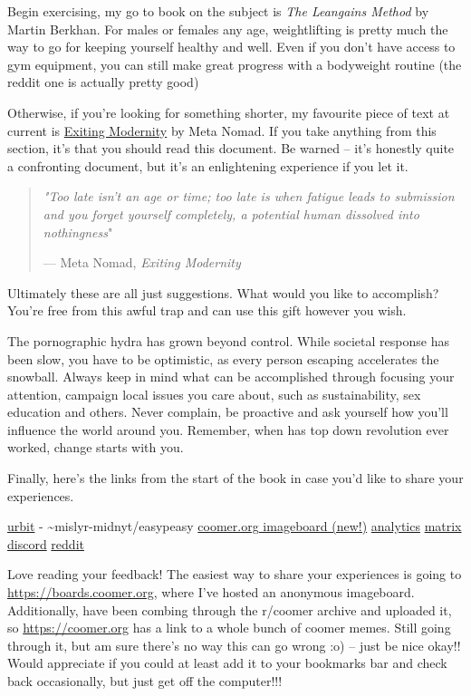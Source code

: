 \documentclass[
]{book}
\begin{document}
Begin exercising, my go to book on the subject is \emph{The Leangains Method} by Martin Berkhan. For males or females any age, weightlifting is pretty much the way to go for keeping yourself healthy and well. Even if you don't have access to gym equipment, you can still make great progress with a bodyweight routine (the reddit one is actually pretty good)

Otherwise, if you're looking for something shorter, my favourite piece of text at current is \href{https://www.meta-nomad.net/exiting-modernity/}{Exiting Modernity} by Meta Nomad. If you take anything from this section, it's that you should read this document. Be warned -- it's honestly quite a confronting document, but it's an enlightening experience if you let it.

\begin{quote}
\emph{"Too late isn't an age or time; too late is when fatigue leads to submission and you forget yourself completely, a potential human dissolved into nothingness}"

--- Meta Nomad, \emph{Exiting Modernity}
\end{quote}

Ultimately these are all just suggestions. What would you like to accomplish? You're free from this awful trap and can use this gift however you wish.

The pornographic hydra has grown beyond control. While societal response has been slow, you have to be optimistic, as every person escaping accelerates the snowball. Always keep in mind what can be accomplished through focusing your attention, campaign local issues you care about, such as sustainability, sex education and others. Never complain, be proactive and ask yourself how you'll influence the world around you. Remember, when has top down revolution ever worked, change starts with you.

Finally, here's the links from the start of the book in case you'd like to share your experiences.

\href{https://urbit.org}{urbit} - \textasciitilde mislyr-midnyt/easypeasy \textbar{} \href{https://coomer.org}{coomer.org imageboard (new!)} \textbar{} \href{https://plausible.io/easypeasymethod.org}{analytics} \textbar{} \href{https://matrix.to/\#/!xmJZznbJXuwzEGSEti:matrix.org?via=matrix.org}{matrix} \textbar{} \href{https://discord.com/invite/bCXEnf9}{discord} \textbar{} \href{https://reddit.com/r/pmohackbook}{reddit}

Love reading your feedback! The easiest way to share your experiences is going to \url{https://boards.coomer.org}, where I've hosted an anonymous imageboard. Additionally, have been combing through the r/coomer archive and uploaded it, so \url{https://coomer.org} has a link to a whole bunch of coomer memes. Still going through it, but am sure there's no way this can go wrong :o) -- just be nice okay!! Would appreciate if you could at least add it to your bookmarks bar and check back occasionally, but just get off the computer!!!
\end{document}
